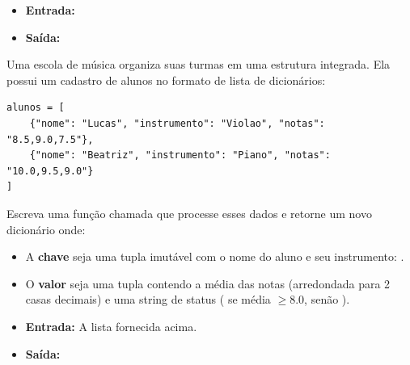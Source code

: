 \begin{enumerate}[label=\textbf{Q\arabic*.}]
\begin{itemize}[leftmargin=*]
    \item \textbf{Entrada:} 
    \item \textbf{Saída:} 
\end{itemize}




Uma escola de música organiza suas turmas em uma estrutura integrada. Ela possui um cadastro de alunos no formato de lista de dicionários:

\begin{verbatim}
alunos = [
    {"nome": "Lucas", "instrumento": "Violao", "notas": "8.5,9.0,7.5"},
    {"nome": "Beatriz", "instrumento": "Piano", "notas": "10.0,9.5,9.0"}
]
\end{verbatim}

Escreva uma função chamada  que processe esses dados e retorne um novo dicionário onde:
\begin{itemize}[leftmargin=*]
    \item A \textbf{chave} seja uma tupla imutável com o nome do aluno e seu instrumento: .
    \item O \textbf{valor} seja uma tupla contendo a média das notas (arredondada para 2 casas decimais) e uma string de status ( se média $\ge 8.0$, senão ).
\end{itemize}

\begin{itemize}[leftmargin=*]
    \item \textbf{Entrada:} A lista  fornecida acima.
    \item \textbf{Saída:} \\
\end{itemize}




\end{enumerate}